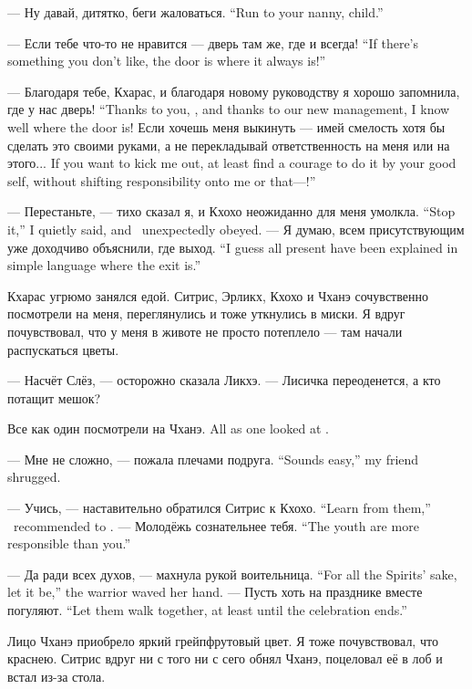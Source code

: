 {--- Ну давай, дитятко, беги жаловаться.}
{``Run to your nanny, child.''}

{--- Если тебе что-то не нравится --- дверь там же, где и всегда!}
{``If there's something you don't like, the door is where it always is!''}

{--- Благодаря тебе, Кхарас, и благодаря новому руководству я хорошо запомнила, где у нас дверь!}
{``Thanks to you, \Kcharas, and thanks to our new management, I know well where the door is!}
{Если хочешь меня выкинуть --- имей смелость хотя бы сделать это своими руками, а не перекладывай ответственность на меня или на этого...}
{If you want to kick me out, at least find a courage to do it by your good self, without shifting responsibility onto me or that---!''}

{--- Перестаньте, --- тихо сказал я, и Кхохо неожиданно для меня умолкла.}
{``Stop it,'' I quietly said, and \Kchoho\ unexpectedly obeyed.}
{--- Я думаю, всем присутствующим уже доходчиво объяснили, где выход.}
{``I guess all present have been explained in simple language where the exit is.''}

Кхарас угрюмо занялся едой.
Ситрис, Эрликх, Кхохо и Чханэ сочувственно посмотрели на меня, переглянулись и тоже уткнулись в миски.
Я вдруг почувствовал, что у меня в животе не просто потеплело --- там начали распускаться цветы.

--- Насчёт Слёз, --- осторожно сказала Ликхэ.
--- Лисичка переоденется, а кто потащит мешок?

{Все как один посмотрели на Чханэ.}
{All as one looked at \Chhanei.}

{--- Мне не сложно, --- пожала плечами подруга.}
{``Sounds easy,'' my friend shrugged.}

{--- Учись, --- наставительно обратился Ситрис к Кхохо.}
{``Learn from them,'' \Sitris\ recommended to \Kchoho.}
{--- Молодёжь сознательнее тебя.}
{``The youth are more responsible than you.''}

{--- Да ради всех духов, --- махнула рукой воительница.}
{``For all the Spirits' sake, let it be,'' the warrior waved her hand.}
{--- Пусть хоть на празднике вместе погуляют.}
{``Let them walk together, at least until the celebration ends.''}

Лицо Чханэ приобрело яркий грейпфрутовый цвет.
Я тоже почувствовал, что краснею.
Ситрис вдруг ни с того ни с сего обнял Чханэ, поцеловал её в лоб и встал из-за стола.

